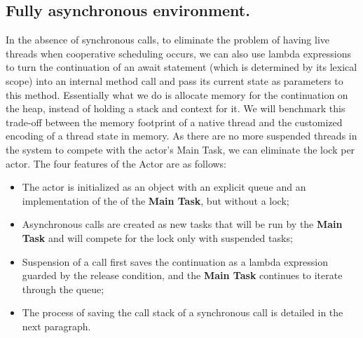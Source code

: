 %
%
%
%
%
%	

\subsection{Fully asynchronous environment.}
In the absence of synchronous calls, to eliminate the problem of having live threads when cooperative scheduling occurs, we can also use lambda expressions to turn the continuation of an await statement (which is determined by its lexical scope) into an internal method call and pass its current state as parameters to this method. Essentially what we do is allocate memory for the continuation on the heap, instead of holding a stack and context for it. We will benchmark this trade-off between the memory footprint of a native thread and the customized encoding of a thread state in memory. As there are no more suspended threads in the system to compete with the actor's Main Task, we can eliminate the lock per actor. The four features of the Actor are as follows:

\begin{itemize}
	\item The actor is initialized as an object with an explicit queue and an implementation of the of the \textbf{Main Task}, but without a lock;
	\item Asynchronous calls are created as new tasks that will be run by the \textbf{Main Task} and will compete for the lock only with suspended tasks;
	\item Suspension of a call first saves the continuation as a lambda expression guarded by the release condition, and the \textbf{Main Task} continues to iterate through the queue;
	\item The process of saving the call stack of a synchronous call is detailed in the next paragraph.
\end{itemize}



